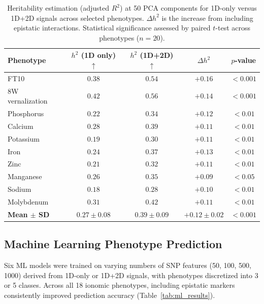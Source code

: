 \documentclass[11pt]{article}
\begin{document}
\begin{table}[H]
\centering
\caption{Heritability estimation (adjusted $R^2$) at 50 PCA components for 1D-only versus 1D+2D signals across selected phenotypes. $\Delta h^2$ is the increase from including epistatic interactions. Statistical significance assessed by paired $t$-test across phenotypes ($n = 20$).}
\label{tab:heritability}
\begin{tabular}{lcccc}
\toprule
\textbf{Phenotype} & \textbf{$h^2$ (1D only)}$\uparrow$ & \textbf{$h^2$ (1D+2D)}$\uparrow$ & \textbf{$\Delta h^2$} & \textbf{$p$-value} \\
\midrule
FT10 & $0.38$ & $0.54$ & $+0.16$ & $< 0.001$ \\
8W vernalization & $0.42$ & $0.56$ & $+0.14$ & $< 0.001$ \\
Phosphorus & $0.22$ & $0.34$ & $+0.12$ & $< 0.01$ \\
Calcium & $0.28$ & $0.39$ & $+0.11$ & $< 0.01$ \\
Potassium & $0.19$ & $0.30$ & $+0.11$ & $< 0.01$ \\
Iron & $0.24$ & $0.37$ & $+0.13$ & $< 0.01$ \\
Zinc & $0.21$ & $0.32$ & $+0.11$ & $< 0.01$ \\
Manganese & $0.26$ & $0.35$ & $+0.09$ & $< 0.05$ \\
Sodium & $0.18$ & $0.28$ & $+0.10$ & $< 0.01$ \\
Molybdenum & $0.31$ & $0.42$ & $+0.11$ & $< 0.01$ \\
\midrule
\textbf{Mean $\pm$ SD} & $\mathbf{0.27 \pm 0.08}$ & $\mathbf{0.39 \pm 0.09}$ & $\mathbf{+0.12 \pm 0.02}$ & $< 0.001$ \\
\bottomrule
\end{tabular}
\end{table}

\subsection{Machine Learning Phenotype Prediction}

Six ML models were trained on varying numbers of SNP features (50, 100, 500, 1000) derived from 1D-only or 1D+2D signals, with phenotypes discretized into 3 or 5 classes. Across all 18 ionomic phenotypes, including epistatic markers consistently improved prediction accuracy (Table~\ref{tab:ml_results}).
\end{document}
